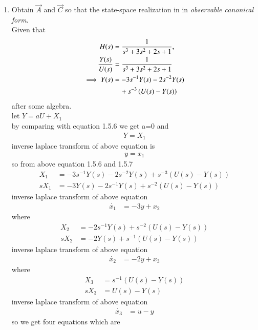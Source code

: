 \begin{enumerate}[label=\thesection.\arabic*.,ref=\thesection.\theenumi]
\item Obtain $\vec{A}$ and $\vec{C}$ so that the state-space realization in in {\em observable canonical form}.
\\
\solution  Given that
\begin{align}
H(s)&=\frac{1}{s^3+3s^2+2s+1},
\\
\frac{Y(s)}{U(s)}&=\frac{1}{s^3+3s^2+2s+1} \\
\implies Y(s)&=-3s^{-1}Y(s)-2s^{-2}Y(s) \nonumber \\
&\quad +s^{-3}\left(U(s)-Y(s)\right)
\end{align}
%
after some algebra.
\\ let $Y=aU+X_{1}$
\\ by comparing with equation 1.5.6 we get a=0 and
\begin{align}
Y=X_{1}
\end{align}
inverse laplace transform of above equation is 
\begin{align}
y=x_{1}
\end{align}
so from above equation 1.5.6 and 1.5.7
\begin{align}
X_{1}&=-3s^{-1}Y(s)-2s^{-2}Y(s)+s^{-3}(U(s)-Y(s))\\
sX_{1}&=-3Y(s)-2s^{-1}Y(s)+s^{-2}(U(s)-Y(s)) 
\end{align}
inverse laplace transform of above equation 
\begin{align}
\dot{x_{1}}&=-3y+x_{2}
\end{align} 
where
\begin{align}
X_{2}&=-2s^{-1}Y(s)+s^{-2}(U(s)-Y(s))\\
sX_{2}&=-2Y(s)+s^{-1}(U(s)-Y(s))
\end{align} 
inverse laplace transform of above equation 
\begin{align}
\dot{x_{2}}&=-2y+x_{3}
\end{align}
where
\begin{align}
X_{3}&=s^{-1}(U(s)-Y(s))\\
sX_{3}&=U(s)-Y(s)
\end{align} 
inverse laplace transform of above equation 
\begin{align}
\dot{x_{3}}&=u-y
\end{align}
so we get four equations which are
\begin{align}

\end{align}
\end{enumerate}
